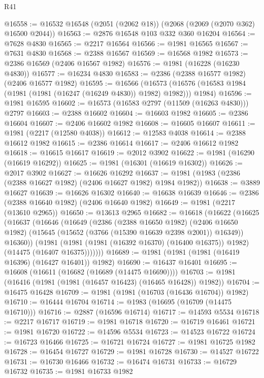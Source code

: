 \begin{lexlean}{R41}
\begin{coremodule}
@16558 := @16532 @16548 (@2051 (@2062 @18)) (@2068 (@2069 (@2070 @362) @16500 @2044))
@16563 := @2876 @16548 @103 @332 @360 @16204
@16564 := @7628 @4830
@16565 := @2217 @16564
@16566 := @1981 @16565
@16567 := @7631 @4830
@16568 := @2388 @16567
@16569 := @16568 @1982
@16573 := @2386 @16569 (@2406 @16567 @1982)
@16576 := @1981 (@16228 (@16230 @4830))
@16577 := @16234 @4830
@16583 := @2386 (@2388 @16577 @1982) (@2406 @16577 @1982)
@16595 := @16566
    (@16573 (@16576 (@16583 @1984 (@1981 (@1981 (@16247 (@16249 @4830)) @1982) @1982))) @1984)
@16596 := @1981 @16595
@16602 := @16573 (@16583 @2797 (@11509 (@16263 @4830))) @2797
@16603 := @2388 @16602
@16604 := @16603 @1982
@16605 := @2386 @16604
@16607 := @2406 @16602 @1982
@16608 := @16605 @16607
@16611 := @1981 (@2217 (@12580 @4038))
@16612 := @12583 @4038
@16614 := @2388 @16612 @1982
@16615 := @2386 @16614
@16617 := @2406 @16612 @1982
@16618 := @16615 @16617
@16619 := @2012 @3902
@16622 := @1981 (@16290 (@16619 @16292))
@16625 := @1981 (@16301 (@16619 @16302))
@16626 := @2017 @3902
@16627 := @16626 @16292
@16637 := @1981 (@1983 (@2386 (@2388 @16627 @1982) (@2406 @16627 @1982) @1984 @1982))
@16638 := @3889 @16627
@16639 := @16626 @16302
@16640 := @16638 @16639
@16646 := @2386 (@2388 @16640 @1982) (@2406 @16640 @1982)
@16649 := @1981 (@2217 (@13610 @2965))
@16650 := @13613 @2965
@16682 := @16618
    (@16622
      (@16625
        (@16637
          (@16646
            (@16649
              (@2386
                (@2388 @16650 @1982)
                (@2406 @16650 @1982)
                (@15645 (@15652 (@3766 (@15390 @16639 @2398 @2001)) @16349))
                @16360))
            (@1981
              (@1981 (@1981 (@16392 @16370) (@16400 @16375)) @1982)
              (@14475 (@16407 @16375)))))))
@16689 := @1981 (@1981 (@1981 (@16419 @16396) (@16427 @16401)) @1982)
@16690 := @16437 @16401
@16695 := @16608 (@16611 (@16682 (@16689 (@14475 @16690))))
@16703 := @1981 (@16416 (@1981 (@1981 (@16457 @16423) (@16465 @16428)) @1982))
@16704 := @16475 @16428
@16709 := @1981 (@1981 (@16703 (@16436 @16704)) @1982)
@16710 := @16444 @16704
@16714 := @1983 (@16695 (@16709 (@14475 @16710)))
@16716 := @2887 (@16596 @16714)
@16717 := @14593 @5534
@16718 := @2217 @16717
@16719 := @1981 @16718
@16720 := @16719 @16461
@16721 := @1981 @16720
@16722 := @14596 @5534
@16723 := @14523 @16722
@16724 := @16723 @16466
@16725 := @16721 @16724
@16727 := @1981 @16725 @1982
@16728 := @16454 @16727
@16729 := @1981 @16728
@16730 := @14527 @16722
@16731 := @16730 @16466
@16732 := @16474 @16731
@16733 := @16729 @16732
@16735 := @1981 @16733 @1982

\end{coremodule}
\end{lexlean}
